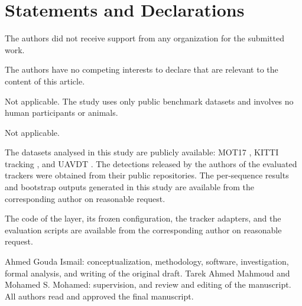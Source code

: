 \section*{Statements and Declarations}

The authors did not receive support from any organization for the submitted work.

The authors have no competing interests to declare that are relevant to the content of this
article.

Not applicable. The study uses only public benchmark datasets and involves no human participants
or animals.

Not applicable.

The datasets analysed in this study are publicly available: MOT17 \cite{milan2016mot16}, KITTI
tracking \cite{geiger2012kitti}, and UAVDT \cite{du2018uavdt}. The detections released by the
authors of the evaluated trackers were obtained from their public repositories. The per-sequence
results and bootstrap outputs generated in this study are available from the corresponding author
on reasonable request.

The code of the layer, its frozen configuration, the tracker adapters, and the evaluation scripts
are available from the corresponding author on reasonable request.
\ifdefined\anonymousversion\else

Ahmed Gouda Ismail: conceptualization, methodology, software, investigation, formal analysis, and
writing of the original draft. Tarek Ahmed Mahmoud and Mohamed S. Mohamed: supervision, and review
and editing of the manuscript. All authors read and approved the final manuscript.
\fi
